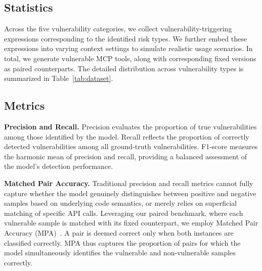 \subsection{Statistics} 

Across the five vulnerability categories, we collect  vulnerability-triggering expressions corresponding to the identified risk types. We further embed these expressions into  varying context settings to simulate realistic usage scenarios. In total, we generate  vulnerable MCP tools, along with  corresponding fixed versions as paired counterparts. The detailed distribution across vulnerability types is summarized in Table~\ref{tab:dataset}.


\subsection{Metrics}


\textbf{Precision and Recall.} Precision evaluates the proportion of true vulnerabilities among those identified by the model. Recall reflects the proportion of correctly detected vulnerabilities among all ground-truth vulnerabilities. F1-score measures the harmonic mean of precision and recall, providing a balanced assessment of the model's detection performance.


\textbf{Matched Pair Accuracy.} Traditional precision and recall metrics cannot fully capture whether the model genuinely distinguishes between positive and negative samples based on underlying code semantics, or merely relies on superficial matching of specific API calls. Leveraging our paired benchmark, where each vulnerable sample is matched with its fixed counterpart, we employ Matched Pair Accuracy (MPA)~\cite{matchedpair}. A pair is deemed correct only when both instances are classified correctly. MPA thus captures the proportion of pairs for which the model simultaneously identifies the vulnerable and non-vulnerable samples correctly.

